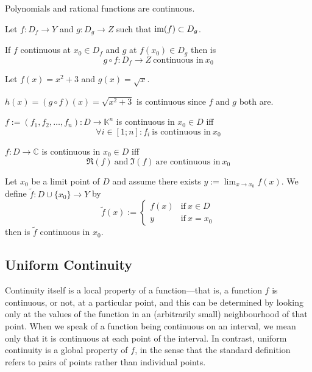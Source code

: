 \begin{corollary}
   Polynomials and rational functions are continuous.
\end{corollary}

\begin{proposition}\label{pro:contin_continuation}
   Let \(f: D_f \to Y\) and \(g: D_g \to Z\) such that \(\operatorname{im}(f) \subset D_g\).

   If \(f\) continuous at \(x_0 \in D_f\) and \(g\) at \(f(x_0) \in D_g\) then is
   \[g \circ f: D_f \to Z~\text{continuous in}~x_0\]
\end{proposition}
\begin{example}
   Let \(f(x) = x^2 + 3\) and \(g(x) = \sqrt{x}\).

   \(h(x) = (g \circ f)(x) = \sqrt{x^2 + 3}\) is continuous since \(f\) and \(g\) both are.
\end{example}

\begin{theorem}
   \(f := (f_1, f_2, \ldots, f_n): D \to \mathbb{K}^n\) is continuous in \(x_0 \in D\) iff
   \[\forall i \in [1; n]: f_i~\text{is continuous in}~x_0\]
\end{theorem}

\begin{theorem}
   \(f: D \to \mathbb{C}\) is continuous in \(x_0 \in D\) iff
   \[\Re(f)~\text{and}~\Im(f)~\text{are continuous in}~x_0\]
\end{theorem}

\begin{proposition}
   Let \(x_0\) be a limit point of \(D\) and assume there exists \(y := \lim_{x \to x_0} f(x)\).
   We define \(\tilde{f}: D \cup \{x_0\} \to Y\) by
   \[\tilde{f}(x) := \begin{cases}f(x) & \text{if}~x \in D\\ y & \text{if}~x = x_0\end{cases}\]
   then is \(\tilde{f}\) continuous in \(x_0\).
\end{proposition}

\subsection{Uniform Continuity}
Continuity itself is a local property of a function—that is, a function \(f\) is continuous, or not, at a particular point, and this can be determined by looking only at the values of the function in an (arbitrarily small) neighbourhood of that point.
When we speak of a function being continuous on an interval, we mean only that it is continuous at each point of the interval.
In contrast, uniform continuity is a global property of \(f\), in the sense that the standard definition refers to pairs of points rather than individual points.

